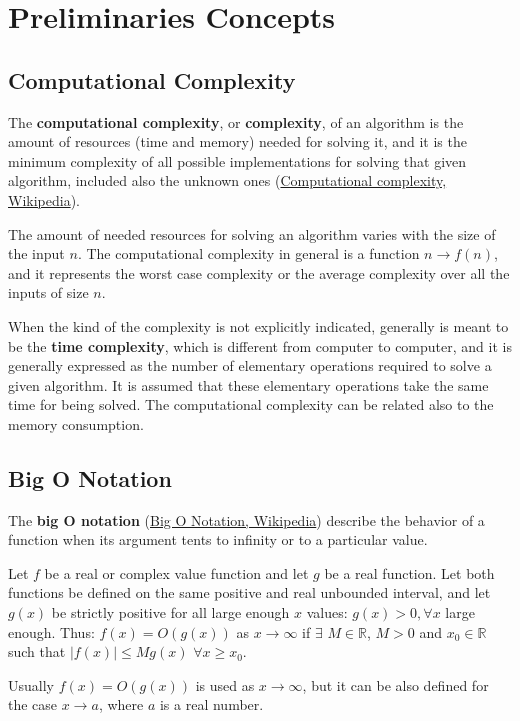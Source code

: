 \setchapterpreamble[u]{\margintoc}
\chapter{Preliminaries Concepts}

\section{Computational Complexity}
The \textbf{computational complexity}, or \textbf{complexity}, of an algorithm is the amount of resources (time and memory) needed for solving it, and it is the minimum complexity of all possible implementations for solving that given algorithm, included also the unknown ones \cite{wikipediacomplexity} (\href{https://en.wikipedia.org/wiki/Computational_complexity}{Computational complexity, Wikipedia}).

The amount of needed resources for solving an algorithm varies with the size of the input \(n\). The computational complexity in general is a function \(n \rightarrow f(n)\), and it represents the worst case complexity or the average complexity over all the inputs of size \(n\).

When the kind of the complexity is not explicitly indicated, generally is meant to be the \textbf{time complexity}, which is different from computer to computer, and it is generally expressed as the number of elementary operations required to solve a given algorithm. It is assumed that these elementary operations take the same time for being solved. The computational complexity can be related also to the memory consumption.

\section{Big O Notation}
The \textbf{big O notation} \cite{wikipediabigo} (\href{https://en.wikipedia.org/wiki/Big_O_notation}{Big O Notation, Wikipedia}) describe the behavior of a function when its argument tents to infinity or to a particular value.

\begin{definition}
Let \(f\) be a real or complex value function and let \(g\) be a real function. Let both functions be defined on the same positive and real unbounded interval, and let \(g(x)\) be strictly positive for all large enough \(x\) values: \(g(x) > 0, \forall x\) large enough. Thus: \(f(x)=O(g(x)) \) as \(x \rightarrow \infty \) if \(\exists\) \(M \in \mathbb{R} \), \(M>0\) and \(x_{0} \in \mathbb{R} \) such that \(|f(x)| \leq Mg(x)\) \(\forall x \geq x_{0}\). 
\end{definition}
Usually \(f(x)=O(g(x))\) is used as \(x \rightarrow \infty\), but it can be also defined for the case \(x \rightarrow a\), where \(a\) is a real number.

